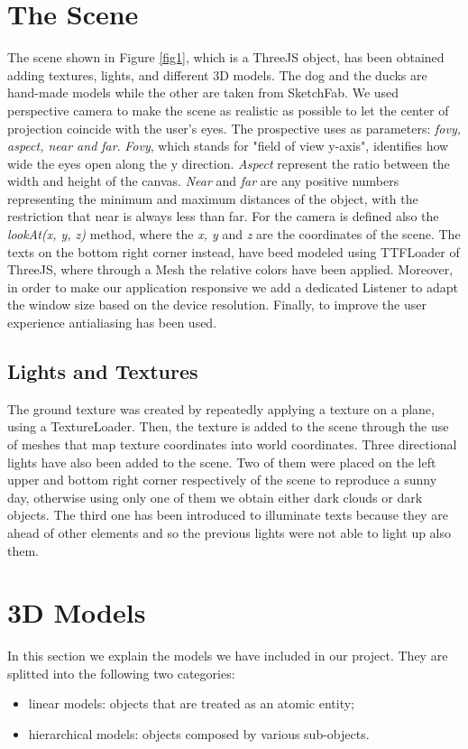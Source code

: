 \documentclass[12pt,a4paper]{article}
\begin{document}
\section{The Scene}
The scene shown in Figure \ref{fig1}, which is a ThreeJS object, 
has been obtained adding textures, lights, and different 3D models. 
The dog and the ducks are hand-made models while the other are 
taken from SketchFab. We used perspective camera to make the scene 
as realistic as possible to let the center of projection coincide 
with the user’s eyes.
The prospective uses as parameters: \textit{fovy, aspect, near and 
far}. \textit{Fovy}, which stands for "field of view y-axis",
identifies how wide the eyes open along the y direction.
\textit{Aspect} represent the ratio between the width and height
of the canvas.
\textit{Near} and \textit{far} are any positive numbers 
representing the minimum and maximum distances of the object, 
with the restriction that near is always less than far.
For the camera is defined also the  
\textit{lookAt(x, y, z)} method, where the \textit{x, y} and \textit{z} 
are the coordinates of the scene.
The texts on the bottom right corner instead, have beed modeled using
TTFLoader of ThreeJS, where through a Mesh the relative 
colors have been applied.
Moreover, in order to make our application responsive we add a 
dedicated Listener to adapt the window size based on the device
resolution. Finally, to improve the user experience antialiasing 
has been used.
\subsection{Lights and Textures}
The ground texture was created by repeatedly applying a texture on 
a plane, using a TextureLoader. Then, the texture is added to the
scene through the use of meshes that map texture coordinates into
world coordinates.
Three directional lights have also been added to the scene. 
Two of them were placed on the left upper and bottom right corner 
respectively of the scene to reproduce a sunny day, otherwise using
only one of them we obtain either dark clouds or dark objects. 
The third one has been introduced to illuminate texts because they 
are ahead of other elements and so the previous lights were
not able to light up also them.
\section{3D Models}
In this section we explain the models we have included in our project. They are splitted into
the following two categories: 
\begin{itemize}
\item linear models: objects that are treated as an atomic entity;
\item hierarchical models: objects composed by various sub-objects. 
\end{itemize}
\end{document}
